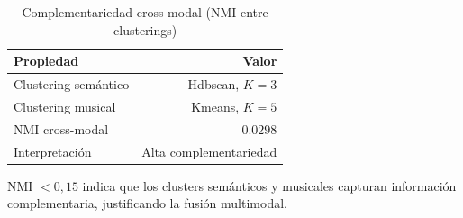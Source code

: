 \begin{table}[htbp]
  \centering
  \caption{Complementariedad cross-modal (NMI entre clusterings)}
  \label{tab:cross_modal_nmi}
  \begin{tabular}{lr}
    \toprule
    Propiedad & Valor \\
    \midrule
    Clustering semántico & Hdbscan, $K=3$ \\
    Clustering musical & Kmeans, $K=5$ \\
    NMI cross-modal & $0.0298$ \\
    \midrule
    Interpretación & Alta complementariedad \\
    \bottomrule
  \end{tabular}
  \begin{tablenotes}[flushleft]
    \small
    \item NMI $< 0{,}15$ indica que los clusters semánticos y musicales capturan información complementaria, justificando la fusión multimodal.
  \end{tablenotes}
\end{table}